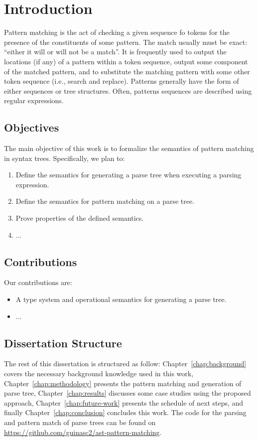 \chapter{Introduction}\label{chap:intro}

Pattern matching is the act of checking a given sequence fo tokens for the presence
of the constituents of some pattern. The match usually must be exact: ``either it 
will or will not be a match''. It is frequently used to output the locations (if any)
of a pattern within a token sequence, output some component of the matched pattern,
and to substitute the matching pattern with some other token sequence (i.e., search
and replace). Patterns generally have the form of either sequences or tree structures.
Often, patterns sequences are described using regular expressions.


\section{Objectives}\label{sec:objectives}

The main objective of this work is to formalize the semantics of pattern matching
in syntax trees. Specifically, we plan to:
\begin{enumerate}
    \item Define the semantics for generating a parse tree when executing a parsing expression.
    \item Define the semantics for pattern matching on a parse tree.
    \item Prove properties of the defined semantics.
    \item ...
\end{enumerate}

\section{Contributions}\label{sec:contributions}

Our contributions are:
\begin{itemize}
    \item A type system and operational semantics for generating a parse tree.
    \item ...
\end{itemize}

\section{Dissertation Structure}\label{sec:structure}

The rest of this dissertation is structured as follow: Chapter~\ref{chap:background}
covers the necessary background knowledge used in this work, Chapter~\ref{chap:methodology}
presents the pattern matching and generation of parse tree, Chapter~\ref{chap:results}
discusses some case studies using the proposed approach, Chapter~\ref{chap:future-work}
presents the schedule of next steps, and finally Chapter~\ref{chap:conclusion} concludes
this work.
The code for the parsing and pattern match of parse trees can be found on 
\url{https://github.com/guinasc2/ast-pattern-matching}.

\cleardoublepage